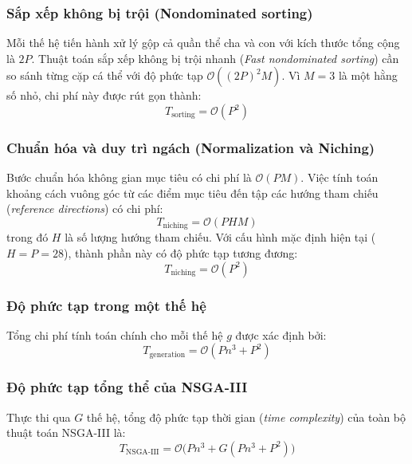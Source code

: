 \documentclass{article}
\begin{document}
\subsubsection{Sắp xếp không bị trội (Nondominated sorting)}
Mỗi thế hệ tiến hành xử lý gộp cả quần thể cha và con với kích thước tổng cộng là $2P$. Thuật toán sắp xếp không bị trội nhanh (\textit{Fast nondominated sorting}) cần so sánh từng cặp cá thể với độ phức tạp $\mathcal{O}((2P)^2 M)$. Vì $M = 3$ là một hằng số nhỏ, chi phí này được rút gọn thành:
\begin{equation}
    T_{\text{sorting}} = \mathcal{O}(P^2)
\end{equation}

\subsubsection{Chuẩn hóa và duy trì ngách (Normalization và Niching)}
Bước chuẩn hóa không gian mục tiêu có chi phí là $\mathcal{O}(P M)$. Việc tính toán khoảng cách vuông góc từ các điểm mục tiêu đến tập các hướng tham chiếu (\textit{reference directions}) có chi phí:
\begin{equation}
    T_{\text{niching}} = \mathcal{O}(P H M)
\end{equation}
trong đó $H$ là số lượng hướng tham chiếu. Với cấu hình mặc định hiện tại ($H = P = 28$), thành phần này có độ phức tạp tương đương:
\begin{equation}
    T_{\text{niching}} = \mathcal{O}(P^2)
\end{equation}

\subsubsection{Độ phức tạp trong một thế hệ}
Tổng chi phí tính toán chính cho mỗi thế hệ $g$ được xác định bởi:
\begin{equation}
    T_{\text{generation}} = \mathcal{O}(P n^3 + P^2)
\end{equation}

\subsubsection{Độ phức tạp tổng thể của NSGA-III}
Thực thi qua $G$ thế hệ, tổng độ phức tạp thời gian (\textit{time complexity}) của toàn bộ thuật toán NSGA-III là:
\begin{equation}
    T_{\text{NSGA-III}} = \mathcal{O}\Big( P n^3 + G(P n^3 + P^2) \Big)
\end{equation}
\end{document}
